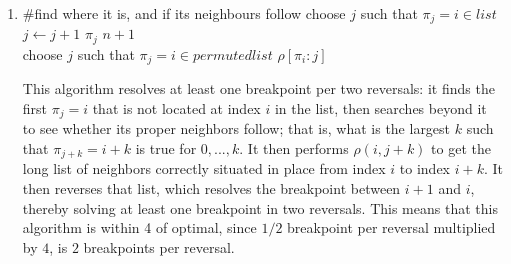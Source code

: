 \documentclass[a4paper]{article}
\begin{document}
\begin{enumerate}
\begin{enumerate}
\begin{proof}
	In the first case, we create the list $0, 1, ...,i-1, i, i+j+1, i+j, ... i+3, i+2, i+1, i+j+2, i+j+3, ..., n, n+1$, which has $2$ breakpoints.  In the second case, we create the list $0, 1, ...,i-1, i, i+1, i+j+1, ... i+3, i+2, i+j+2, i+j+3, ..., n, n+1$, which has $2$ breakpoints.  Therefore, we can resolve at most one breakpoint with a single reversal in a list with three breakpoints.
	\end{proof}
	In an ideal situation, if $b(\pi)$ is even we could continue resolving $2$ breakpoints until we have $0$ breakpoints, and if $b(\pi)$ is odd we can resolve $2$ breakpoints per reversal until we have $3$ breakpoints (since we cannot have only $1$ breakpoint).  We can then perform a reversal to resolve $1$ breakpoint, leaving us with $2$, and perform the final reversal.\\
	Therefore, the lower bound of the number of reversals needed to resolve $b(\pi)$ breakpoints is $\lceil \frac{b(\pi)}{2} \rceil$.
	\item
	\begin{algorithmic}
				\State \#find where it is, and if its neighbours follow
				\State choose $j$ such that $\pi_j = i \in list$
					\State $j \gets j+1$
				\EndWhile
				\Return $\pi_j$
			\EndIf
		\EndFor
		\Return $n+1$
	\EndFunction\\
		\State choose $j$ such that $\pi_j = i \in permutedlist$
		\State $\rho[\pi_i:j]$
	\EndWhile
	\end{algorithmic}
	This algorithm resolves at least one breakpoint per two reversals: it finds the first $\pi_j = i$ that is not located at index $i$ in the list, then searches beyond it to see whether its proper neighbors follow; that is, what is the largest $k$ such that $\pi_{j+k} = i+k$ is true for $0, ..., k$.  It then performs $\rho(i, j+k)$ to get the long list of neighbors correctly situated in place from index $i$ to index $i+k$.  It then reverses that list, which resolves the breakpoint between $i+1$ and $i$, thereby solving at least one breakpoint in two reversals.  This means that this algorithm is within 4 of optimal, since $1/2$ breakpoint per reversal multiplied by $4$, is $2$ breakpoints per reversal.
	\end{enumerate}
\end{enumerate}
\end{document}
